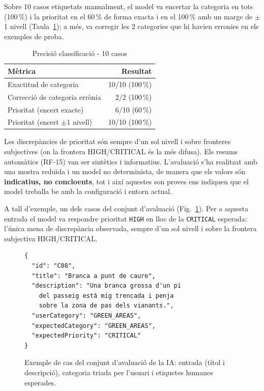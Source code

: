 \documentclass[10pt,a4paper,twocolumn,twoside]{article}
\begin{document}
		Sobre 10 casos etiquetats manualment, el model va encertar la categoria en tots (100\,\%) i la prioritat en el 60\,\% de forma exacta i en el 100\,\% amb un marge de $\pm$1 nivell (Taula~\ref{tab:ai}); a més, va corregir les 2 categories que hi havien erronies en els exemples de proba.
		
		\begin{table}[H]
			\centering
			\footnotesize
			\caption{Precisió classificació - 10 casos}
			\label{tab:ai}
			\begin{tabular}{|l|r|}
				\hline
				Mètrica & Resultat \\
				\hline
				Exactitud de categoria & 10/10 (100\,\%) \\
				\hline
				Correcció de categoria errònia & 2/2 (100\,\%) \\
				\hline
				Prioritat (encert exacte) & 6/10 (60\,\%) \\
				\hline
				Prioritat (encert $\pm$1 nivell) & 10/10 (100\,\%) \\
				\hline
			\end{tabular}
		\end{table}
		
		Les discrepàncies de prioritat són sempre d'un sol nivell i sobre fronteres subjectives (on la frontera HIGH/CRITICAL és la més difusa). Els resums automàtics (RF-15) van ser sintètics i informatius. L'avaluació s'ha realitzat amb una mostra reduïda i un model no determinista, de manera que els valors són \textbf{indicatius, no concloents}, tot i així aquestes son proves ens indiquen que el model treballa be amb la configuració i entorn actual.

		A tall d'exemple, un dels casos del conjunt d'avaluació (Fig.~\ref{fig:ai-case}). Per a aquesta entrada el model va respondre prioritat \texttt{HIGH} en lloc de la \texttt{CRITICAL} esperada: l'única mena de discrepància observada, sempre d'un sol nivell i sobre la frontera subjectiva HIGH/CRITICAL.

	\begin{figure}[H]
		\footnotesize
\begin{verbatim}
{
  "id": "C08",
  "title": "Branca a punt de caure",
  "description": "Una branca grossa d'un pi
    del passeig està mig trencada i penja
    sobre la zona de pas dels vianants.",
  "userCategory": "GREEN_AREAS",
  "expectedCategory": "GREEN_AREAS",
  "expectedPriority": "CRITICAL"
}
\end{verbatim}
		\caption{Exemple de cas del conjunt d'avaluació de la IA: entrada (títol i descripció), categoria triada per l'usuari i etiquetes humanes esperades.}
		\label{fig:ai-case}
	\end{figure}
		
\end{document}
